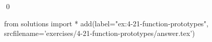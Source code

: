 
\begin{ex}
  \label{ex:4-21-function-prototypes}
  
  \qed
\end{ex}
\begin{python0}
from solutions import *
add(label="ex:4-21-function-prototypes",
    srcfilename='exercises/4-21-function-prototypes/answer.tex')
\end{python0}
